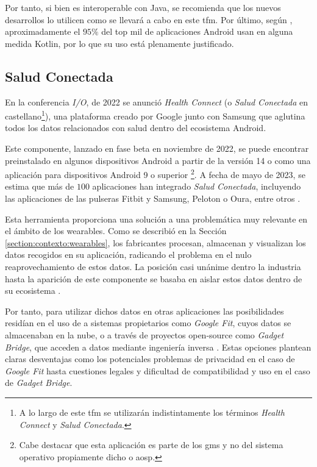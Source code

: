         Por tanto, si bien es interoperable con Java, se recomienda que los nuevos desarrollos lo utilicen \cite{lardinois_kotlin_2019} como se llevará a cabo en este \gls{tfm}. Por último, según \cite{kotlin_help_kotlin_nodate}, aproximadamente el $95\%$ del top mil de aplicaciones Android usan en alguna medida Kotlin, por lo que su uso está plenamente justificado.
        
    \subsection{Salud Conectada}
        \label{section:salud_conectada}
        En la conferencia \textit{I/O}, de 2022 se anunció \textit{Health Connect} (o \textit{Salud Conectada} en castellano\footnote{A lo largo de este \gls{tfm} se utilizarán indistintamente los términos \textit{Health Connect} y \textit{Salud Conectada}.}), una plataforma creado por Google junto con Samsung \cite{wilk_introducing_2022} que aglutina todos los datos relacionados con salud dentro del ecosistema Android. 
        
        Este componente, lanzado en fase beta en noviembre de 2022, se puede encontrar preinstalado en algunos dispositivos Android a partir de la versión 14 \cite{ayuda_de_android_informacion_nodate} o como una aplicación para dispositivos Android 9 o superior \cite{pandey_health_2023} \footnote{Cabe destacar que esta aplicación es parte de los \gls{gms} y no del sistema operativo propiamente dicho o \gls{aosp}.}. A fecha de mayo de 2023, se estima que más de $100$ aplicaciones han integrado \textit{Salud Conectada}, incluyendo las aplicaciones de las pulseras Fitbit y Samsung, Peloton o Oura, entre otros \cite{malik_googles_2023}.
        
        Esta herramienta proporciona una solución a una problemática muy relevante en el ámbito de los \glspl{wearable}. Como se describió en la Sección \ref{section:contexto:wearables}, los fabricantes procesan, almacenan y visualizan los datos recogidos en su aplicación, radicando el problema en el nulo reaprovechamiento de estos datos. La posición casi unánime dentro la 
        industria hasta la aparición de este componente se basaba en aislar estos datos  dentro de su ecosistema \cite{ramirez_android_2022} \cite{rahman_android_2023}. 
        
        Por tanto, para utilizar dichos datos en otras aplicaciones las posibilidades residían en el uso de a sistemas propietarios como \textit{Google Fit}, cuyos datos se almacenaban en la nube, o a través de proyectos \gls{open-source} como \textit{Gadget Bridge}, que acceden a datos mediante ingeniería inversa \cite{freeyourgadget_gadgetbridge_nodate}. Estas opciones plantean claras desventajas como los potenciales problemas de privacidad en el caso de \textit{Google Fit} hasta cuestiones legales y dificultad de compatibilidad y uso en el caso de \textit{Gadget Bridge}.
        
